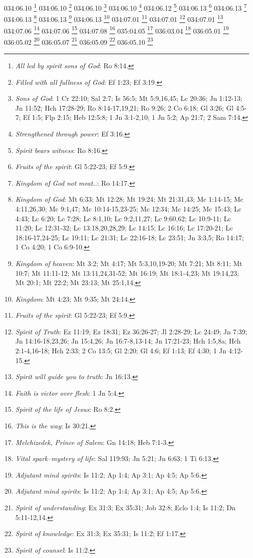 {034:06.10 \footnote{\textit{All led by spirit sons of God}: Ro 8:14.}
034:06.10 \footnote{\textit{Filled with all fullness of God}: Ef 1:23; Ef 3:19.}
034:06.10 \footnote{\textit{Sons of God}: 1 Cr 22:10; Sal 2:7; Is 56:5; Mt 5:9,16,45; Lc 20:36; Jn 1:12-13; Jn 11:52; Hch 17:28-29; Ro 8:14-17,19,21; Ro 9:26; 2 Co 6:18; Gl 3:26; Gl 4:5-7; Ef 1:5; Flp 2:15; Heb 12:5:8; 1 Jn 3:1-2,10; 1 Jn 5:2; Ap 21:7; 2 Sam 7:14.}
034:06.10 \footnote{\textit{Strengthened through power}: Ef 3:16.}
034:06.12 \footnote{\textit{Spirit bears witness}: Ro 8:16.}
034:06.13 \footnote{\textit{Fruits of the spirit}: Gl 5:22-23; Ef 5:9.}
034:06.13 \footnote{\textit{Kingdom of God not meat..}: Ro 14:17.}
034:06.13 \footnote{\textit{Kingdom of God}: Mt 6:33; Mt 12:28; Mt 19:24; Mt 21:31,43; Mc 1:14-15; Mc 4:11,26,30; Mc 9:1,47; Mc 10:14-15,23-25; Mc 12:34; Mc 14:25; Mc 15:43; Lc 4:43; Lc 6:20; Lc 7:28; Lc 8:1,10; Lc 9:2,11,27; Lc 9:60,62; Lc 10:9-11; Lc 11:20; Lc 12:31-32; Lc 13:18,20,28,29; Lc 14:15; Lc 16:16; Lc 17:20-21; Lc 18:16-17,24-25; Lc 19:11; Lc 21:31; Lc 22:16-18; Lc 23:51; Jn 3:3,5; Ro 14:17; 1 Co 4:20; 1 Co 6:9-10.}
034:06.13 \footnote{\textit{Kingdom of heaven}: Mt 3:2; Mt 4:17; Mt 5:3,10,19-20; Mt 7:21; Mt 8:11; Mt 10:7; Mt 11:11-12; Mt 13:11,24,31-52; Mt 16:19; Mt 18:1-4,23; Mt 19:14,23; Mt 20:1; Mt 22:2; Mt 23:13; Mt 25:1,14.}
034:06.13 \footnote{\textit{Kingdom}: Mt 4:23; Mt 9:35; Mt 24:14.}
034:07.01 \footnote{\textit{Fruits of the spirit}: Gl 5:22-23; Ef 5:9.}
034:07.01 \footnote{\textit{Spirit of Truth}: Ez 11:19; Ez 18:31; Ez 36:26-27; Jl 2:28-29; Lc 24:49; Jn 7:39; Jn 14:16-18,23,26; Jn 15:4,26; Jn 16:7-8,13-14; Jn 17:21-23; Hch 1:5,8a; Hch 2:1-4,16-18; Hch 2:33; 2 Co 13:5; Gl 2:20; Gl 4:6; Ef 1:13; Ef 4:30; 1 Jn 4:12-15.}
034:07.01 \footnote{\textit{Spirit will guide you to truth}: Jn 16:13.}
034:07.06 \footnote{\textit{Faith is victor over flesh}: 1 Jn 5:4.}
034:07.06 \footnote{\textit{Spirit of the life of Jesus}: Ro 8:2.}
034:07.08 \footnote{\textit{This is the way}: Is 30:21.}
035:04.05 \footnote{\textit{Melchizedek, Prince of Salem}: Gn 14:18; Heb 7:1-3.}
036:03.04 \footnote{\textit{Vital spark--mystery of life}: Sal 119:93; Jn 5:21; Jn 6:63; 1 Ti 6:13.}
036:05.01 \footnote{\textit{Adjutant mind spirits}: Is 11:2; Ap 1:4; Ap 3:1; Ap 4:5; Ap 5:6.}
036:05.02 \footnote{\textit{Adjutant mind spirits}: Is 11:2; Ap 1:4; Ap 3:1; Ap 4:5; Ap 5:6.}
036:05.07 \footnote{\textit{Spirit of understanding}: Ex 31:3; Ex 35:31; Job 32:8; Eclo 1:4; Is 11:2; Dn 5:11-12,14.}
036:05.09 \footnote{\textit{Spirit of knowledge}: Ex 31:3; Ex 35:31; Is 11:2; Ef 1:17.}
036:05.10 \footnote{\textit{Spirit of counsel}: Is 11:2.}
}

